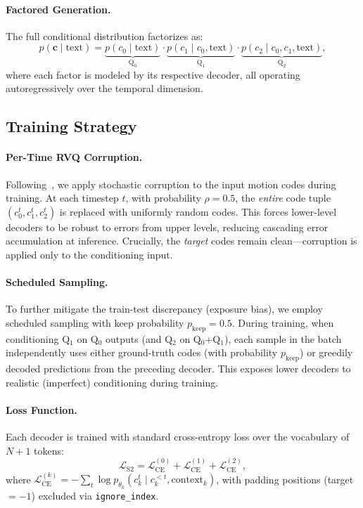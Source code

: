 \documentclass[10pt,twocolumn]{article}
\begin{document}
\paragraph{Factored Generation.}
The full conditional distribution factorizes as:
\begin{equation}
    p(\mathbf{c} \mid \text{text}) = \underbrace{p(c_0 \mid \text{text})}_{\text{Q}_0} \cdot \underbrace{p(c_1 \mid c_0, \text{text})}_{\text{Q}_1} \cdot \underbrace{p(c_2 \mid c_0, c_1, \text{text})}_{\text{Q}_2},
\end{equation}
where each factor is modeled by its respective decoder, all operating autoregressively over the temporal dimension.

\subsection{Training Strategy}

\paragraph{Per-Time RVQ Corruption.}
Following~\cite{t2m-hifigpt}, we apply stochastic corruption to the input motion codes during training. At each timestep $t$, with probability $\rho{=}0.5$, the \emph{entire} code tuple $(c_0^t, c_1^t, c_2^t)$ is replaced with uniformly random codes. This forces lower-level decoders to be robust to errors from upper levels, reducing cascading error accumulation at inference. Crucially, the \emph{target} codes remain clean---corruption is applied only to the conditioning input.

\paragraph{Scheduled Sampling.}
To further mitigate the train-test discrepancy (exposure bias), we employ scheduled sampling with keep probability $p_\text{keep}{=}0.5$. During training, when conditioning Q$_1$ on Q$_0$ outputs (and Q$_2$ on Q$_0${+}Q$_1$), each sample in the batch independently uses either ground-truth codes (with probability $p_\text{keep}$) or greedily decoded predictions from the preceding decoder. This exposes lower decoders to realistic (imperfect) conditioning during training.

\paragraph{Loss Function.}
Each decoder is trained with standard cross-entropy loss over the vocabulary of $N{+}1$ tokens:
\begin{equation}
    \mathcal{L}_{\text{S2}} = \mathcal{L}_{\text{CE}}^{(0)} + \mathcal{L}_{\text{CE}}^{(1)} + \mathcal{L}_{\text{CE}}^{(2)},
    \label{eq:stage2_loss}
\end{equation}
where $\mathcal{L}_{\text{CE}}^{(k)} = -\sum_t \log p_{\theta_k}(c_k^t \mid c_k^{<t}, \text{context}_k)$, with padding positions (target $= {-}1$) excluded via \texttt{ignore\_index}.
\end{document}

